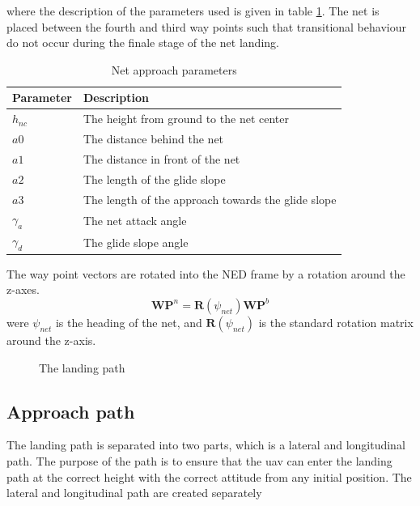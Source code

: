 where the description of the parameters used is given in table \ref{Tb:Approach Parameters}. The net is placed between the fourth and third way points such that transitional behaviour do not occur during the finale stage of the net landing.
\begin{table}[H]
\begin{center}
    \begin{tabular}{ | l | l |}
    \hline
    \textbf{Parameter} & \textbf{Description} \\ \hline
    $h_{nc}$ & The height from ground to the net center \\ \hline
    $a0$ & The distance behind the net \\ \hline
    $a1$ & The distance in front of the net \\ \hline
    $a2$ & The length of the glide slope \\ \hline
    $a3$ & The length of the approach towards the glide slope \\ \hline
    $\gamma_a$ & The net attack angle \\ \hline
    $\gamma_d$ & The glide slope angle \\ \hline
    \end{tabular}
\end{center}
\caption{Net approach parameters }
\label{Tb:Approach Parameters}
\end{table}
The way point vectors are rotated into the NED frame by a rotation around the z-axes.
\begin{equation}
\mathbf{WP}^n = \mathbf{R}(\psi_{net})\mathbf{WP}^b
\end{equation}
were $\psi_{net}$ is the heading of the net, and $\mathbf{R}(\psi_{net})$ is the standard rotation matrix around the z-axis.
\begin{figure}
\def\svgwidth{\textwidth} %

\caption{The landing path}
\label{Fig:LandingPhase}
\end{figure}

\subsection{Approach path}\label{SS:LandingApproach}
The landing path is separated into two parts, which is a lateral and longitudinal path. The purpose of the path is to ensure that the \gls{uav} can enter the landing path at the correct height with the correct attitude from any initial position. The lateral and longitudinal path are created separately 

